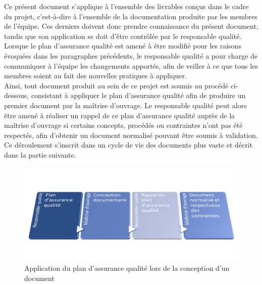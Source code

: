 Ce présent document s’applique à l’ensemble des livrables conçus dans le cadre du projet, c’est-à-dire à l’ensemble de la documentation produite par les membres de l’équipe. Ces derniers doivent donc prendre connaissance du présent document, tandis que son application se doit d’être contrôlée par le responsable qualité. Lorsque le plan d’assurance qualité est amené à être modifié pour les raisons évoquées dans les paragraphes précédents, le responsable qualité a pour charge de communiquer à l’équipe les changements apportés, afin de veiller à ce que tous les membres soient au fait des nouvelles pratiques à appliquer. \\

Ainsi, tout document produit au sein de ce projet est soumis au procédé ci-dessous, consistant à appliquer le plan d’assurance qualité afin de produire un premier document par la maîtrise d’ouvrage. Le responsable qualité peut alors être amené à réaliser un rappel de ce plan d’assurance qualité auprès de la maîtrise d’ouvrage si certains concepts, procédés ou contraintes n’ont pas été respectés, afin d’obtenir un document normalisé pouvant être soumis à validation. Ce déroulement s’inscrit dans un cycle de vie des documents plus vaste et décrit dans la partie suivante.

\begin{figure}[H]
    \centering
    \label{fig-objec}
    \includegraphics[scale=0.5]{figures/applic_paq.png}
    \caption{Application du plan d’assurance qualité lors de la conception d’un document}
\end{figure}